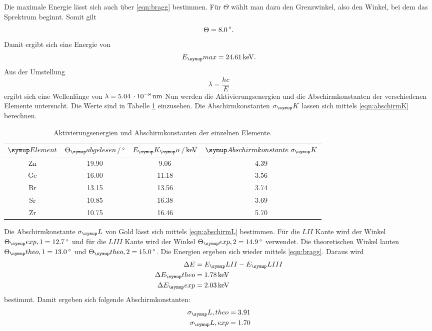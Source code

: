 Die maximale Energie lässt sich auch über \eqref{eqn:bragg} bestimmen. Für $\Theta$
wählt man dazu den Grenzwinkel, also den Winkel, bei dem das Sprektrum beginnt.
Somit gilt
\begin{equation}
  \Theta = 8.0 \,\si{\degree}.
\end{equation}
Damit ergibt sich eine Energie von
\begin{equation}
  E_\su{max} = 24.61 \keV.
\end{equation}
Aus der Umstellung
\begin{equation}
  \lambda = \frac{hc}{E}
\end{equation}
ergibt sich eine Wellenlänge von $\lambda=5.04\,\cdot10^{-8}\,\si{\nano\meter}$
Nun werden die Aktivierungsenergien und die Abschirmkonstanten
der verschiedenen Elemente untersucht. Die
Werte sind in Tabelle \ref{tab:Energie} einzusehen. Die Abschirmkonstanten $\sigma_\su{K}$
lassen sich mittels \eqref{eqn:abschirmK} berechnen.
\begin{table}
  \centering
  \begin{tabular}{c c c c}
    \toprule
    $\su{Element}$ & $\Theta_\su{abgelesen} \,/\dgr$ & $E_\su{K_\su{\alpha}}\,/ \keV$ & $\su{Abschirmkonstante}\,\,\sigma_\su{K}$\\
    \midrule
    Zn & 19.90 &  9.06 & 4.39   \\
    Ge & 16.00 & 11.18 & 3.56   \\
    Br & 13.15 & 13.56 & 3.74   \\
    Sr & 10.85 & 16.38 & 3.69   \\
    Zr & 10.75 & 16.46 & 5.70   \\
    \bottomrule
  \end{tabular}
  \caption{Aktivierungsenergien und Abschirmkonstanten der einzelnen Elemente.}
  \label{tab:Energie}
\end{table}
Die Abschirmkonstante $\sigma_\su{L}$
von Gold lässt sich mittels \eqref{eqn:abschirmL} bestimmen.
Für die $LII$ Kante wird der Winkel $\Theta_\su{exp,1} = 12.7 \dgr$ und für die $LIII$ Kante
wird der Winkel $\Theta_\su{exp,2} = 14.9 \dgr$ verwendet. Die theoretischen Winkel lauten
$\Theta_\su{theo,1} = 13.0 \dgr$ und $\Theta_\su{theo,2} = 15.0 \dgr$.
Die Energien ergeben sich wieder mittels \eqref{eqn:bragg}. Daraus wird
\begin{align*}
  \Delta E &= E_\su{LII} - E_\su{LIII} \\
  \Delta E_\su{theo} &= 1.78 \keV \\
  \Delta E_\su{exp} &= 2.03 \keV \\
\end{align*}
bestimmt.
Damit ergeben sich folgende Abschirmkonstanten:
\begin{align*}
  \sigma_\su{L, theo} &= 3.91  \\
  \sigma_\su{L, exp} &= 1.70 \\
\end{align*}

